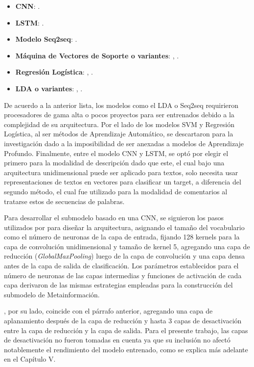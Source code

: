\begin{itemize}
	\item \textbf{CNN}: \cite{pr_cheng2019deeplearning}.
	\item \textbf{LSTM}: \cite{pr_jin2019dayssuccess}.
	\item \textbf{Modelo Seq2seq}: \cite{pr_lee2018contentDL}.
	\item \textbf{Máquina de Vectores de Soporte o variantes}: \cite{pr_sawhney2016usingLT}, \cite{pr_chen2019keywords_crowdfunding}.
	\item \textbf{Regresión Logística}: \cite{pr_mitra2014phrases}, \cite{pr_zhou2015projectdesc}.
	\item \textbf{LDA o variantes}: \cite{pr_yuan2016textanalytics}, \cite{pr_sawhney2016usingLT}.
\end{itemize}

De acuerdo a la anterior lista, los modelos como el LDA o Seq2seq requirieron procesadores de gama alta o pocos proyectos para ser entrenados debido a la complejidad de su arquitectura. Por el lado de los modelos SVM y Regresión Logística, al ser métodos de Aprendizaje Automático, se descartaron para la investigación dado a la imposibilidad de ser anexadas a modelos de Aprendizaje Profundo. Finalmente, entre el modelo CNN y LSTM, se optó por elegir el primero para la modalidad de descripción dado que este, el cual bajo una arquitectura unidimensional puede ser aplicado para textos, solo necesita usar representaciones de textos en vectores para clasificar un target, a diferencia del segundo método, el cual fue utilizado para la modalidad de comentarios al tratarse estos de secuencias de palabras.

Para desarrollar el submodelo basado en una CNN, se siguieron los pasos utilizados por \cite{tec_malik2019pythonnlp} para diseñar la arquitectura, asignando el tamaño del vocabulario como el número de neuronas de la capa de entrada, fijando 128 kernels para la capa de convolución unidimensional y tamaño de kernel 5, agregando una capa de reducción (\textit{GlobalMaxPooling}) luego de la capa de convolución y una capa densa antes de la capa de salida de clasificación. Los parámetros establecidos para el número de neuronas de las capas intermedias y funciones de activación de cada capa derivaron de las mismas estrategias empleadas para la construcción del submodelo de Metainformación.

\cite{tec_ardi2020conv1d}, por su lado, coincide con el párrafo anterior, agregando una capa de aplanamiento después de la capa de reducción y hasta 3 capas de desactivación entre la capa de reducción y la capa de salida. Para el presente trabajo, las capas de desactivación no fueron tomadas en cuenta ya que su inclusión no afectó notablemente el rendimiento del modelo entrenado, como se explica más adelante en el Capítulo V.

